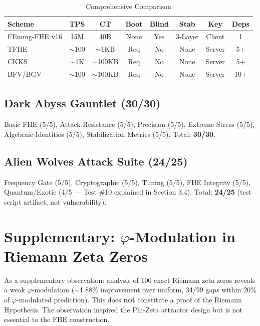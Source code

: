 \documentclass{article}
\begin{document}
\begin{table}[H]
\centering
\begin{tabular}{|l|c|c|c|c|c|c|c|}
\hline
\textbf{Scheme} & \textbf{TPS} & \textbf{CT} & \textbf{Boot} & \textbf{Blind} & \textbf{Stab} & \textbf{Key} & \textbf{Deps} \\
\hline
FEmmg-FHE v16 & 15M & 40B & None & Yes & 3-Layer & Client & 1 \\
TFHE & $\sim$100 & $\sim$1KB & Req & No & None & Server & 5+ \\
CKKS & $\sim$1K & $\sim$100KB & Req & No & None & Server & 5+ \\
BFV/BGV & $\sim$100 & $\sim$100KB & Req & No & None & Server & 10+ \\
\hline
\end{tabular}
\caption{Comprehensive Comparison}
\end{table}

\subsection{Dark Abyss Gauntlet (30/30)}
Basic FHE (5/5), Attack Resistance (5/5), Precision (5/5), Extreme Stress (5/5), Algebraic Identities (5/5), Stabilization Metrics (5/5). Total: \textbf{30/30}.

\subsection{Alien Wolves Attack Suite (24/25)}
Frequency Gate (5/5), Cryptographic (5/5), Timing (5/5), FHE Integrity (5/5), Quantum/Exotic (4/5 — Test \#10 explained in Section 3.4). Total: \textbf{24/25} (test script artifact, not vulnerability).

\section{Supplementary: $\varphi$-Modulation in Riemann Zeta Zeros}

As a supplementary observation: analysis of 100 exact Riemann zeta zeros reveals a weak $\varphi$-modulation ($\sim$1.88\% improvement over uniform, 34/99 gaps within 20\% of $\varphi$-modulated prediction). This does \textbf{not} constitute a proof of the Riemann Hypothesis. The observation inspired the Phi-Zeta attractor design but is not essential to the FHE construction.
\end{document}
